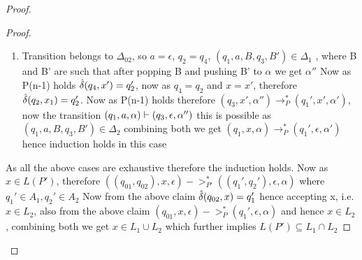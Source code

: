 \begin{soln}
\begin{proof}
\begin{proof}
\begin{enumerate}
     \item Transition belongs to $\Delta_{02}$, so $a=\epsilon$, $q_2=q_4$, $(q_1,a,B,q_3,B') \in \Delta_1$ , where B and B' are such that after popping B and pushing B' to $\alpha$ we get $\alpha''$
     \newline Now as P(n-1) holds $\hat{\delta}(q_{4},x')=q_2'$, now as $q_{4}=q_2$ and $x=x'$, therefore  $\hat{\delta}(q_{2},x_1)=q_2'$. 
     \newline Now as P(n-1) holds therefore $(q_{3},x',\alpha'') \to_{P}^* (q_1',x',\alpha')$, now the transition $( q_1,a,\alpha) \vdash (q_3,\epsilon,\alpha'')$  this is possible as $(q_1,a,B,q_3,B') \in \Delta_2$ combining both we get $( q_{1},x,\alpha) \to_{P}^* (q_1',\epsilon,\alpha')$ hence induction holds in this case
\end{enumerate}
As all the above cases are exhaustive therefore the induction holds.
\newline Now as $x \in L(P')$, therefore $( (q_{01},q_{02}),x,\epsilon) ->_{P'}^* ((q_1',q_2'),\epsilon,\alpha)$ where $q_1' \in A_1, q_2' \in A_2$
Now from the above claim $\hat{\delta}(q_{02},x)=q_1'$ hence accepting x, i.e. $x \in L_2$, also from the above claim $( q_{01},x,\epsilon) ->_{P}^* (q_1',\epsilon,\alpha)$ and hence $x \in L_2$, combining both we get $x\in L_1 \cup L_2$ which further implies $L(P') \subseteq L_1 \cap L_2$


\end{proof}
\end{proof}
\end{soln}
